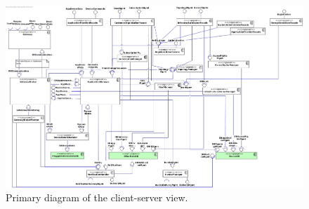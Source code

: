 
    \begin{figure}[!htp]
    	\centering
    	\includegraphics[width=\textwidth]{images/component-PRIMARY}
    	\caption{Primary diagram of the client-server view.}\label{fig:cc-primary}
    \end{figure}
